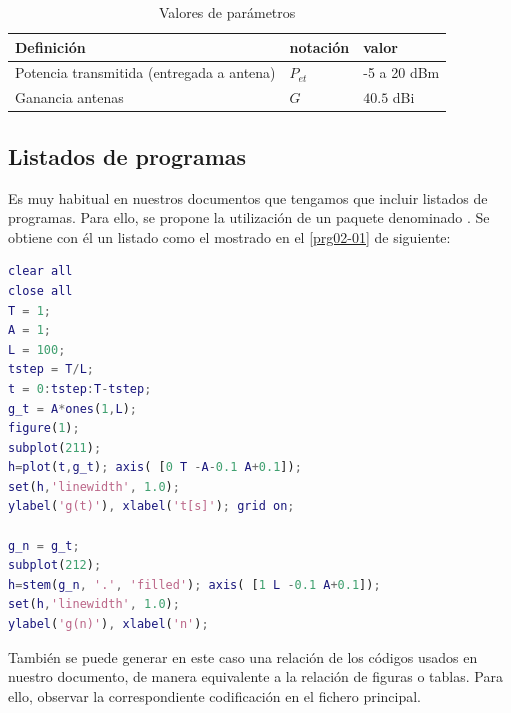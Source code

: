 \begin{table}[h]
\caption{Valores de parámetros}
\begin{center}
\begin{tabular}{p{7cm}p{2cm}p{2cm}} %
Definición & notación & valor\\
 \hline
Potencia transmitida	(entregada a antena) & $P_{et}$ & -5 a 20 dBm	\\
Ganancia antenas & $G$ & $40.5$ dBi\\	
 \hline
\end{tabular}
\end{center}
\end{table}%

\subsection{Listados de programas}
Es muy habitual en nuestros documentos que tengamos que incluir listados de programas. Para ello, se propone la utilización de un paquete denominado . Se obtiene con él un listado como el mostrado en el \autoref{prg02-01} de \matlab siguiente: 

\begin{lstlisting}[language=Matlab,caption={Representación de la función $\rect(t-T/2)$}, breaklines=true, label=prg02-01]
clear all
close all
T = 1;
A = 1;
L = 100;
tstep = T/L;                                
t = 0:tstep:T-tstep;   
g_t = A*ones(1,L); 
figure(1);
subplot(211);
h=plot(t,g_t); axis( [0 T -A-0.1 A+0.1]);
set(h,'linewidth', 1.0);
ylabel('g(t)'), xlabel('t[s]'); grid on;

g_n = g_t;
subplot(212);
h=stem(g_n, '.', 'filled'); axis( [1 L -0.1 A+0.1]);
set(h,'linewidth', 1.0);
ylabel('g(n)'), xlabel('n');
\end{lstlisting}

También se puede generar en este caso una relación de los códigos usados en nuestro documento, de manera equivalente a la relación de figuras o tablas. Para ello, observar la correspondiente codificación en el fichero principal.
 
